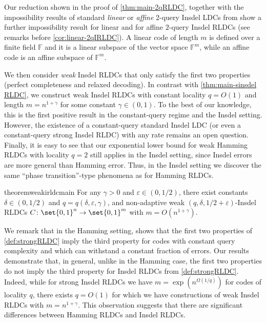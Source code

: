 \documentclass[10pt,a4paper]{article}
\theoremstyle{remark}
\newcommand{\eps}{\ensuremath{\varepsilon}}
\providecommand{\F}{\ensuremath{\mathbb{F}}\xspace}
\begin{document}
Our reduction shown in the proof of \cref{thm:main-2qRLDC},  together with the impossibility results of standard {\em linear} or {\em affine} 2-query Insdel LDCs from \cite{blocki2021exponential} show a further impossibility result for linear and for affine $2$-query Insdel RLDCs (see remarks before \cref{cor:linear-2qIRLDC}). A linear code of length $m$ is defined over a finite field $\F$ and it is a linear subspace of the vector space $\F^m$, while an affine code is an affine subspace of $\F^m$.
 
 
 We then consider {\em weak} Insdel RLDCs that only satisfy the first two properties (perfect completeness and relaxed decoding). In contrast with \cref{thm:main-sinsdel RLDC}, we construct weak Insdel RLDCs with constant locality $q=O(1)$ and length $m=n^{1+\gamma}$ for some constant $\gamma \in (0, 1)$. To the best of our knowledge, this is the first positive result in the constant-query regime and the Insdel setting. However, the existence of a constant-query standard Insdel LDC (or even a constant-query strong Insdel RLDC) with any rate remains an open question. Finally, it is easy to see that our exponential lower bound for weak Hamming RLDCs with locality $q=2$ still applies in the Insdel setting, since Insdel errors are more general than Hamming error. Thus, in the Insdel setting we discover the same ``phase transition''-type phenomena as for Hamming RLDCs.
 
 
 
 
\begin{restatable}{theorem}{weakirldcmain} \label{thm:main-rildc-construction}
	For any $\gamma>0$ and $\eps \in (0,1/2)$, there exist constants $\delta \in (0,1/2)$ and $q=q(\delta,\eps,\gamma)$, and non-adaptive weak $(q,\delta,1/2+\eps)$-Insdel RLDCs $C\colon\set{0,1}^n\rightarrow \set{0,1}^m$ with $m=O(n^{1+\gamma})$. %
\end{restatable}


 

 We remark that in the Hamming setting, \cite{Ben-SassonGHSV06} shows that the first two properties of \cref{def:strongRLDC} imply the third property for codes with constant query complexity and which can withstand a constant fraction of errors.
 Our results demonstrate that, in general, unlike in the Hamming case, the first two properties do not imply the third property for Insdel RLDCs from \cref{def:strongRLDC}. %
 Indeed, while for strong Insdel RLDCs we have $m= \exp(n^{\Omega(1/q)})$  for codes of locality $q$, there exists $q=O(1)$ for which we have constructions of weak Insdel RLDCs with $m=n^{1+\gamma}.$ This observation suggests that there are significant differences between Hamming RLDCs and Insdel RLDCs. 
\end{document}
